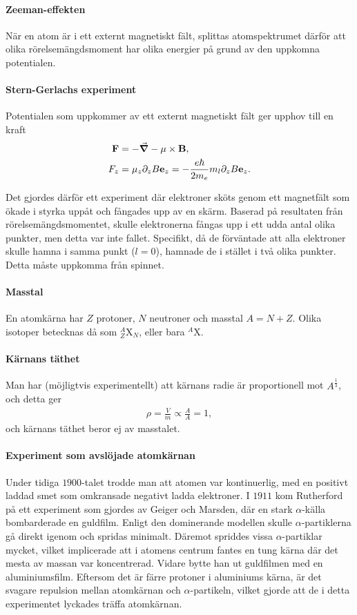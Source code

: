 \paragraph{Zeeman-effekten}
När en atom är i ett externt magnetiskt fält, splittas atomspektrumet därför att olika rörelsemängdsmoment har olika energier på grund av den uppkomna potentialen.

\paragraph{Stern-Gerlachs experiment}
Potentialen som uppkommer av ett externt magnetiskt fält ger upphov till en kraft
\begin{align*}
	\vb{F} &= -\grad{-\vb{\mu}\times\vb{B}}, \\
	F_{z}  &= \mu_{z}\partial_{z}B\vb{e}_{z} = -\frac{e\hbar}{2m_{e}}m_{l}\partial_{z}B\vb{e}_{z}.
\end{align*}

Det gjordes därför ett experiment där elektroner sköts genom ett magnetfält som ökade i styrka uppåt och fångades upp av en skärm. Baserad på resultaten från rörelsemängdsmomentet, skulle elektronerna fångas upp i ett udda antal olika punkter, men detta var inte fallet. Specifikt, då de förväntade att alla elektroner skulle hamna i samma punkt ($l = 0$), hamnade de i stället i två olika punkter. Detta måste uppkomma från spinnet.

\paragraph{Masstal}
En atomkärna har $Z$ protoner, $N$ neutroner och masstal $A = N + Z$. Olika isotoper betecknas då som $^{A}_{Z}\text{X}_{N}$, eller bara $^{A}\text{X}$.

\paragraph{Kärnans täthet}
Man har (möjligtvis experimentellt) att kärnans radie är proportionell mot $A^{\frac{1}{3}}$, och detta ger
\begin{align*}
	\rho = \frac{V}{m} \propto \frac{A}{A} = 1,
\end{align*}
och kärnans täthet beror ej av masstalet.

\paragraph{Experiment som avslöjade atomkärnan}
Under tidiga $1900$-talet trodde man att atomen var kontinuerlig, med en positivt laddad smet som omkransade negativt ladda elektroner. I $1911$ kom Rutherford på ett experiment som gjordes av Geiger och Marsden, där en stark $\alpha$-källa bombarderade en guldfilm. Enligt den dominerande modellen skulle $\alpha$-partiklerna gå direkt igenom och spridas minimalt. Däremot spriddes vissa $\alpha$-partiklar mycket, vilket implicerade att i atomens centrum fantes en tung kärna där det mesta av massan var koncentrerad. Vidare bytte han ut guldfilmen med en aluminiumsfilm. Eftersom det är färre protoner i aluminiums kärna, är det svagare repulsion mellan atomkärnan och $\alpha$-partikeln, vilket gjorde att de i detta experimentet lyckades träffa atomkärnan.